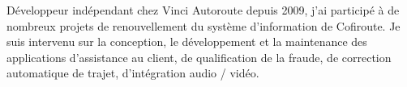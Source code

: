 

\begin{cvparagraph}

Développeur indépendant chez Vinci Autoroute depuis 2009, j'ai participé à de nombreux projets de renouvellement du système d'information de Cofiroute. Je suis intervenu sur la conception, le développement et la maintenance des applications d'assistance au client, de qualification de la fraude, de correction automatique de trajet, d'intégration audio / vidéo.
\end{cvparagraph}

